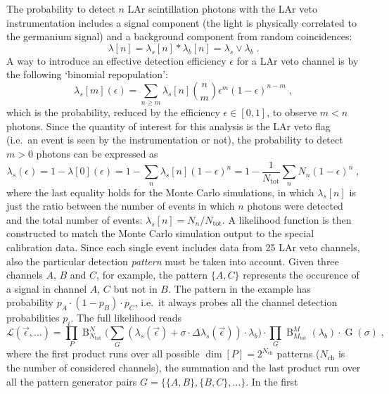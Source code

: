 The probability to detect $n$ LAr scintillation photons with the LAr veto instrumentation
includes a signal component (the light is physically correlated to the germanium signal)
and a background component from random coincidences:
\[
  \lambda[n] = \lambda_s[n] * \lambda_b[n] = \lambda_s \vee \lambda_b \;.
\]
A way to introduce an effective detection efficiency $\epsilon$ for a LAr veto channel is
by the following `binomial repopulation':
\[
  \lambda_s[m](\epsilon) = \sum_{n \geq m} \lambda_s[n] \binom{n}{m} \epsilon^m
    {(1-\epsilon)}^{n-m} \;,
\]
which is the probability, reduced by the efficiency $\epsilon \in [0,1]$, to observe $m <
n$ photons. Since the quantity of interest for this analysis is the LAr veto flag (i.e.~an
event is seen by the instrumentation or not), the probability to detect $m > 0$ photons
can be expressed as
\[
  \lambda_s(\epsilon) = 1 - \lambda[0](\epsilon)
                      = 1 - \sum_n \lambda_s[n] {(1-\epsilon)}^n
                      = 1 - \frac{1}{N_\text{tot}} \sum_n N_n {(1-\epsilon)}^n \;,
\]
where the last equality holds for the Monte Carlo simulations, in which $\lambda_s[n]$ is
just the ratio between the number of events in which $n$ photons were detected and the
total number of events: $\lambda_s[n] = N_n / N_\text{tot}$.
\newpar
A likelihood function is then constructed to match the Monte Carlo simulation output to the
special calibration data. Since each single event includes data from 25 LAr veto channels,
also the particular detection \emph{pattern} must be taken into account. Given three channels
$A$, $B$ and $C$, for example, the pattern $\{A,C\}$ represents the occurence of a signal
in channel $A$, $C$ but not in $B$. The pattern in the example has probability $p_A
\cdot (1-p_B) \cdot p_C$, i.e.~it always probes all the channel detection probabilities
$p_i$. The full likelihood reads
\begin{equation}\label{eq:bkg:lar:ph2:pca-likelihood}
  \mathcal{L}(\vec{\epsilon}, \ldots) =
    \prod_P \operatorname{B}_{N_\text{tot}}^N \big(
      \sum_G ( \lambda_s(\vec{\epsilon}) + \sigma \cdot \Delta\lambda_s(\vec{\epsilon})) \cdot
      \lambda_b \big)
    \cdot \prod_G \operatorname{B}_{M_\text{tot}}^M (\lambda_b) \cdot
    \operatorname{G}(\sigma) \;,
\end{equation}
where the first product runs over all possible $\dim{[P]} = 2^{N_\text{ch}}$ patterns
($N_\text{ch}$ is the number of considered channels), the summation and the last product
run over all the pattern generator pairs $G = \{\{A,B\},\{B,C\},\ldots\}$. In the first
